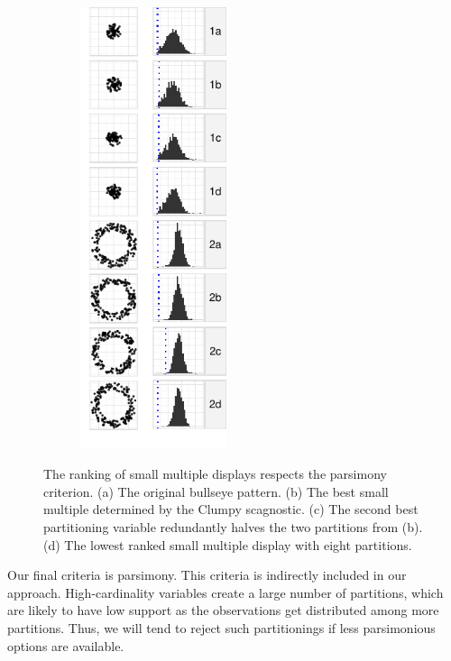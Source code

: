 \begin{figure}
\begin{subfigure}[b]{1.7in}
	\includegraphics[width=1.7in]{images/5_12851615653375-cluster2.pdf}
      \caption{}
      \label{fig:pars4}
    \end{subfigure}
    \caption{The ranking of small multiple displays respects the parsimony criterion. (a) The original bullseye pattern. (b) The best small multiple determined by the Clumpy scagnostic. (c) The second best partitioning variable redundantly halves the two partitions from (b). (d) The lowest ranked small multiple display with eight partitions.}
    \label{fig:parsimonious}
  \end{figure}

Our final criteria is parsimony. This criteria is indirectly included in our approach. High-cardinality variables create a large number of partitions, which are likely to have low support as the observations get distributed among more partitions. Thus, we will tend to reject such partitionings if less parsimonious options are available.
 
